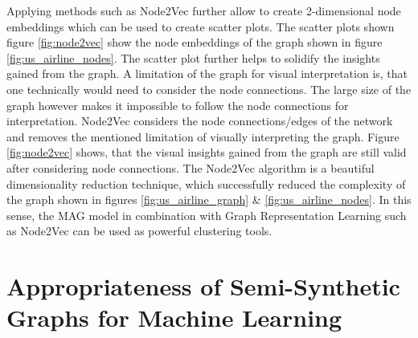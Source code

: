   \noindent Applying methods such as Node2Vec further allow to create
  2-dimensional node embeddings which can be used to create scatter plots. The
  scatter plots shown figure \ref{fig:node2vec} show the node embeddings of the
  graph shown in figure \ref{fig:us_airline_nodes}. The scatter plot further
  helps to solidify the insights gained from the graph. A limitation of the
  graph for visual interpretation is, that one technically would need to
  consider the node connections. The large size of the graph however makes it
  impossible to follow the node connections for interpretation. Node2Vec
  considers the node connections/edges of the network and removes the mentioned
  limitation of visually interpreting the graph. Figure \ref{fig:node2vec}
  shows, that the visual insights gained from the graph are still valid after
  considering node connections. The Node2Vec algorithm is a beautiful
  dimensionality reduction technique, which successfully reduced the complexity
  of the graph shown in figures \ref{fig:us_airline_graph} \& 
  \ref{fig:us_airline_nodes}. In this sense, the MAG model in combination with
  Graph Representation Learning such as Node2Vec can be used as powerful
  clustering tools.
  
  \section{Appropriateness of Semi-Synthetic Graphs for Machine Learning}
  \label{section:gml_performance}


